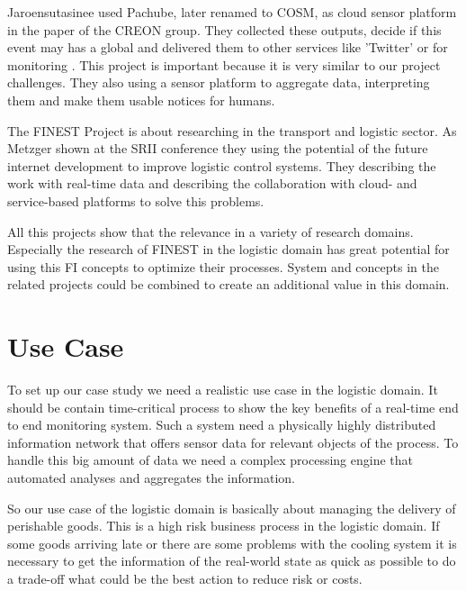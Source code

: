 \documentclass{acm_proc_article-sp}
\begin{document}
Jaroensutasinee used Pachube, later renamed to COSM, as cloud sensor platform in the paper of the CREON group. They collected these outputs, decide if this event may has a global  and delivered them to other services like 'Twitter' or for monitoring \cite{jaroensutasineecreon}.
This project is important because it is very similar to our project challenges.
They also using a sensor platform to aggregate data, interpreting them and make them usable notices for humans.

The FINEST Project is about researching in the transport and logistic sector. As Metzger shown at the SRII conference they using the potential of the future internet development to improve logistic control systems. They describing the work with real-time data and describing the collaboration with cloud- and service-based platforms to solve this problems. \cite{metzger2012predictive}

All this projects show that the relevance in a variety of research domains. Especially the research of FINEST in the logistic domain has great potential for using this FI concepts to optimize their processes. System and concepts in the related projects could be combined to create an additional value in this domain.

\section{Use Case}
\label{sec:Use Case}
To set up our case study we need a realistic use case in the logistic domain. It should be contain time-critical process to show the key benefits of a real-time end to end monitoring system. Such a system need a physically highly distributed information network that offers sensor data for relevant objects of the process.
To handle this big amount of data we need a complex processing engine that automated analyses and aggregates the information. 

So our use case of the logistic domain is basically about managing the delivery of perishable goods. This is a high risk business process in the logistic domain. If some goods arriving late or there are some problems with the cooling system it is necessary to get the information of the real-world state as quick as possible to do a trade-off what could be the best action to reduce risk or costs.
\end{document}
